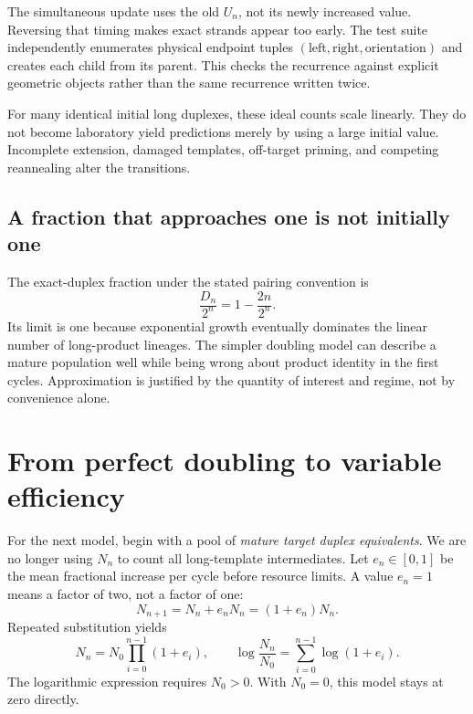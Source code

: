 \begin{center}\end{center}
The simultaneous update uses the old $U_n$, not its newly increased value. Reversing that timing makes exact strands appear too early. The test suite independently enumerates physical endpoint tuples $(\text{left},\text{right},\text{orientation})$ and creates each child from its parent. This checks the recurrence against explicit geometric objects rather than the same recurrence written twice.

For many identical initial long duplexes, these ideal counts scale linearly. They do not become laboratory yield predictions merely by using a large initial value. Incomplete extension, damaged templates, off-target priming, and competing reannealing alter the transitions.

\subsection{A fraction that approaches one is not initially one}
The exact-duplex fraction under the stated pairing convention is
\begin{equation}
\frac{D_n}{2^n}=1-\frac{2n}{2^n}.
\end{equation}
Its limit is one because exponential growth eventually dominates the linear number of long-product lineages. The simpler doubling model can describe a mature population well while being wrong about product identity in the first cycles. Approximation is justified by the quantity of interest and regime, not by convenience alone.

\section{From perfect doubling to variable efficiency}\label{sec:efficiency}
For the next model, begin with a pool of \emph{mature target duplex equivalents}. We are no longer using $N_n$ to count all long-template intermediates. Let $e_n\in[0,1]$ be the mean fractional increase per cycle before resource limits. A value $e_n=1$ means a factor of two, not a factor of one:
\begin{equation}
N_{n+1}=N_n+e_nN_n=(1+e_n)N_n.
\end{equation}
Repeated substitution yields
\begin{equation}
N_n=N_0\prod_{i=0}^{n-1}(1+e_i),\qquad
\log\frac{N_n}{N_0}=\sum_{i=0}^{n-1}\log(1+e_i). \label{eq:growth}
\end{equation}
The logarithmic expression requires $N_0>0$. With $N_0=0$, this model stays at zero directly.

